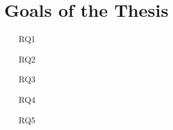 
\section{Goals of the Thesis}

\lipsum[1-1]

\begin{itemize}
    \item[RQ1] \lipsum[1-1]
    \item[RQ2] \lipsum[2-2]
    \item[RQ3] \lipsum[3-3]
    \item[RQ4] \lipsum[4-4]
    \item[RQ5] \lipsum[5-5]
\end{itemize}

\lipsum[6-7]